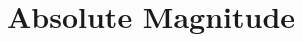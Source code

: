 \hypertarget{group___absolute_magnitude}{}\section{Absolute Magnitude}
\label{group___absolute_magnitude}
